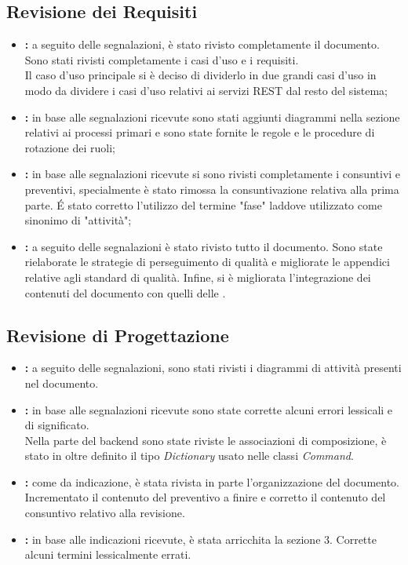 	\subsection{Revisione dei Requisiti}
	\begin{itemize}
		\item \textbf{\docNameAdR:} a seguito delle segnalazioni, è stato rivisto completamente il documento. Sono stati rivisti completamente i casi d'uso e i requisiti.\\
		Il caso d'uso principale si è deciso di dividerlo in due grandi casi d'uso in modo da dividere i casi d'uso relativi ai servizi REST dal resto del sistema;
		\item \textbf{\docNameNdP:} in base alle segnalazioni ricevute sono stati aggiunti diagrammi nella sezione relativi ai processi primari e sono state fornite le regole e le procedure di rotazione dei ruoli;
		\item \textbf{\docNamePdP:} in base alle segnalazioni ricevute si sono rivisti completamente i consuntivi e preventivi, specialmente è stato rimossa la consuntivazione relativa alla prima parte. É stato corretto l'utilizzo del termine "fase" laddove utilizzato come sinonimo di "attività";
		\item \textbf{\docNamePdQ:} a seguito delle segnalazioni è stato rivisto tutto il documento. Sono state rielaborate le strategie di perseguimento di qualità e migliorate le appendici relative agli standard di qualità. Infine, si è migliorata l'integrazione dei contenuti del documento con quelli delle \docNameNdP.
	\end{itemize}
	
	\subsection{Revisione di Progettazione}
	\begin{itemize}
	Come da segnalazione il registro delle modifiche dei documenti è stato rivisto incrementandolo e modificandone l'ordinamento dal tipo di modifica al numero di versione del documento.
		\item \textbf{\docNameAdR:} a seguito delle segnalazioni, sono stati rivisti i diagrammi di attività presenti nel documento.
		\item \textbf{\docNameST:} in base alle segnalazioni ricevute sono state corrette alcuni errori lessicali e di significato.\\
		Nella parte del backend sono state riviste le associazioni di composizione, è stato in oltre definito il tipo \textit{Dictionary} usato nelle classi \textit{Command}.
		\item \textbf{\docNamePdP:} come da indicazione, è stata rivista in parte l'organizzazione del documento. Incrementato il contenuto del preventivo a finire e corretto il contenuto del consuntivo relativo alla revisione.
		\item \textbf{\docNamePdQ:} in base alle indicazioni ricevute, è stata arricchita la sezione 3. Corrette alcuni termini lessicalmente errati. 
	\end{itemize}

\pagebreak